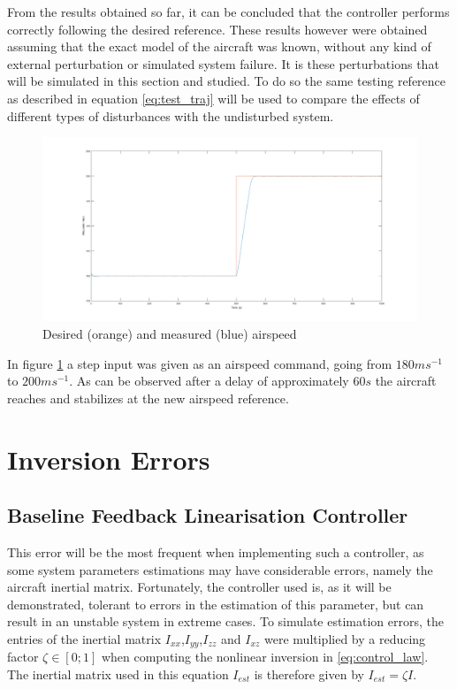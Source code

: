 From the results obtained so far, it can be concluded that the controller performs correctly following the desired reference. These results however were obtained assuming that the exact model of the aircraft was known, without any kind of external perturbation or simulated system failure. It is these perturbations that will be simulated in this section and studied. To do so the same testing reference as described in equation \ref{eq:test_traj} will be used to compare the effects of different types of disturbances with the undisturbed system.

\begin{figure}[H]
\centering
\includegraphics[width=1.1\textwidth]{Figures/Results/speed_command.png}
\caption[Airspeed reference following]{Desired (orange) and measured (blue) airspeed}
\label{fig:speed_command}
\end{figure}

In figure \ref{fig:speed_command} a step input was given as an airspeed command, going from $180ms^{-1}$ to $200ms^{-1}$. As can be observed after a delay of approximately $60s$ the aircraft reaches and stabilizes at the new airspeed reference.
\section{Inversion Errors}
\label{section:results/inversion_errors}
	
\subsection{Baseline Feedback Linearisation Controller}
This error will be the most frequent when implementing such a controller, as some system parameters estimations may have considerable errors, namely the aircraft inertial matrix. Fortunately, the controller used is, as it will be demonstrated, tolerant to errors in the estimation of this parameter, but can result in an unstable system in extreme cases. To simulate estimation errors, the entries of the inertial matrix $I_{xx}$,$I_{yy}$,$I_{zz}$ and $I_{xz}$ were multiplied by a reducing factor $\zeta \in [0;1]$ when computing the nonlinear inversion in \ref{eq:control_law}. The inertial matrix used in this equation $I_{est}$ is therefore given by $I_{est} = \zeta I$.

